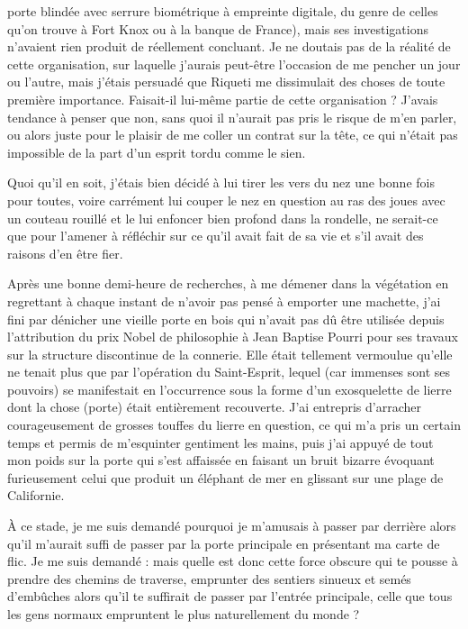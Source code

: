 porte blindée avec serrure biométrique à empreinte digitale, du genre de celles qu’on trouve à Fort Knox ou à la banque de France), mais ses investigations n’avaient rien produit de réellement concluant. Je ne doutais pas de la réalité de cette organisation, sur laquelle j’aurais peut-être l’occasion de me pencher un jour ou l’autre, mais j’étais persuadé que Riqueti me dissimulait des choses de toute première importance. Faisait-il lui-même partie de cette organisation ? J’avais tendance à penser que non, sans quoi il n’aurait pas pris le risque de m’en parler, ou alors juste pour le plaisir de me coller un contrat sur la tête, ce qui n’était pas impossible de la part d’un esprit tordu comme le sien.

Quoi qu’il en soit, j’étais bien décidé à lui tirer les vers du nez une bonne fois pour toutes, voire carrément lui couper le nez en question au ras des joues avec un couteau rouillé et le lui enfoncer bien profond dans la rondelle, ne serait-ce que pour l’amener à réfléchir sur ce qu’il avait fait de sa vie et s’il avait des raisons d’en être fier.

Après une bonne demi-heure de recherches, à me démener dans la végétation en regrettant à chaque instant de n’avoir pas pensé à emporter une machette, j’ai fini par dénicher une vieille porte en bois qui n’avait pas dû être utilisée depuis l’attribution du prix Nobel de philosophie à Jean Baptise Pourri pour ses travaux sur la structure discontinue de la connerie. Elle était tellement vermoulue qu’elle ne tenait plus que par l’opération du Saint-Esprit, lequel (car immenses sont ses pouvoirs) se manifestait en l’occurrence sous la forme d’un exosquelette de lierre dont la chose (porte) était entièrement recouverte. J’ai entrepris d’arracher courageusement de grosses touffes du lierre en question, ce qui m’a pris un certain temps et permis de m’esquinter gentiment les mains, puis j’ai appuyé de tout mon poids sur la porte qui s’est affaissée en faisant un bruit bizarre évoquant furieusement celui que produit un éléphant de mer en glissant sur une plage de Californie.

À ce stade, je me suis demandé pourquoi je m’amusais à passer par derrière alors qu’il m’aurait suffi de passer par la porte principale en présentant ma carte de flic. Je me suis demandé : mais quelle est donc cette force obscure qui te pousse à prendre des chemins de traverse, emprunter des sentiers sinueux et semés d’embûches alors qu’il te suffirait de passer par l’entrée principale, celle que tous les gens normaux empruntent le plus naturellement du monde ?

